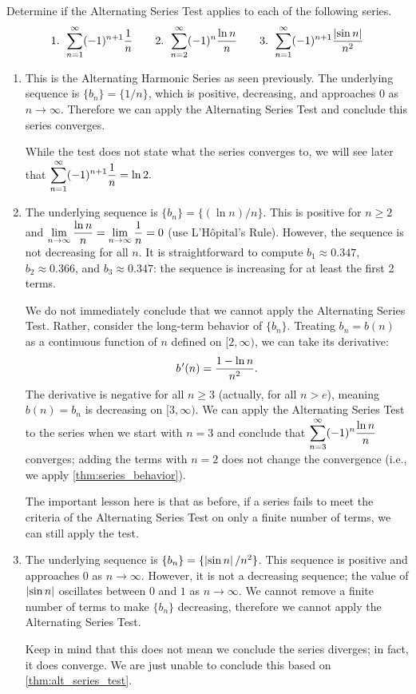 \begin{example}\label{ex_alt1}%
Determine if the Alternating Series Test applies to each of the following series.
\[
 \text{1. }\sum_{n=1}^\infty (-1)^{n+1}\frac1n\qquad
 \text{2. }\sum_{n=2}^\infty (-1)^n\frac{\ln n}{n}\qquad
 \text{3. }\sum_{n=1}^\infty (-1)^{n+1}\frac{\left\lvert \sin n \right\rvert}{n^2}
\]
\solution
\begin{enumerate}
	\item This is the Alternating Harmonic Series as seen previously. The underlying sequence is $\{b_n\} = \{1/n\}$, which is positive, decreasing, and approaches 0 as $n\to\infty$. Therefore we can apply the Alternating Series Test and conclude this series converges. 
	
	While the test does not state what the series converges to, we will see later that $\displaystyle \sum_{n=1}^\infty (-1)^{n+1}\frac1n=\ln2.$
	
	\item		The underlying sequence is $\{b_n\} = \{(\ln n)/n\}$. This is positive for $n\geq 2$ and $\displaystyle \lim_{n\to \infty} \frac{\ln n}{n}=\lim_{n\to \infty}\frac{1}{n}=0$ (use L'Hôpital's Rule). However, the sequence is not decreasing for all $n$. It is straightforward to compute $b_1\approx0.347$, $b_2\approx 0.366$, and $b_3\approx 0.347$: the sequence is increasing for at least the first 2 terms. 
	
	We do not immediately conclude that we cannot apply the Alternating Series Test. Rather, consider the long-term behavior of $\{b_n\}$. Treating $b_n=b(n)$ as a continuous function of $n$ defined on $[2,\infty)$, we can take its derivative:
	\[b\primeskip'(n) = \frac{1-\ln n}{n^2}.\]
	The derivative is negative for all $n\geq 3$ (actually, for all $n>e$), meaning $b(n)=b_n$ is decreasing on $[3,\infty)$. We can apply the Alternating Series Test to the series when we start with $n=3$ and conclude that $\displaystyle \sum_{n=3}^\infty(-1)^n\frac{\ln n}{n}$ converges; adding the terms with $n=2$ does not change the convergence (i.e., we apply \autoref{thm:series_behavior}).
	
	The important lesson here is that as before, if a series fails to meet the criteria of the Alternating Series Test on only a finite number of terms, we can still apply the test.
	
	\item  The underlying sequence is $\{b_n\} = \{\left\lvert \sin n \right\rvert/n^2\}$. This sequence is positive and approaches $0$ as $n\to\infty$. However, it is not a decreasing sequence; the value of $\left\lvert \sin n \right\rvert$ oscillates between $0$ and $1$ as $n\to\infty$. We cannot remove a finite number of terms to make $\{b_n\}$ decreasing, therefore we cannot apply the Alternating Series Test.
	
	Keep in mind that this does not mean we conclude the series diverges; in fact, it does converge. We are just unable to conclude this based on \autoref{thm:alt_series_test}.
\end{enumerate}
\end{example}


